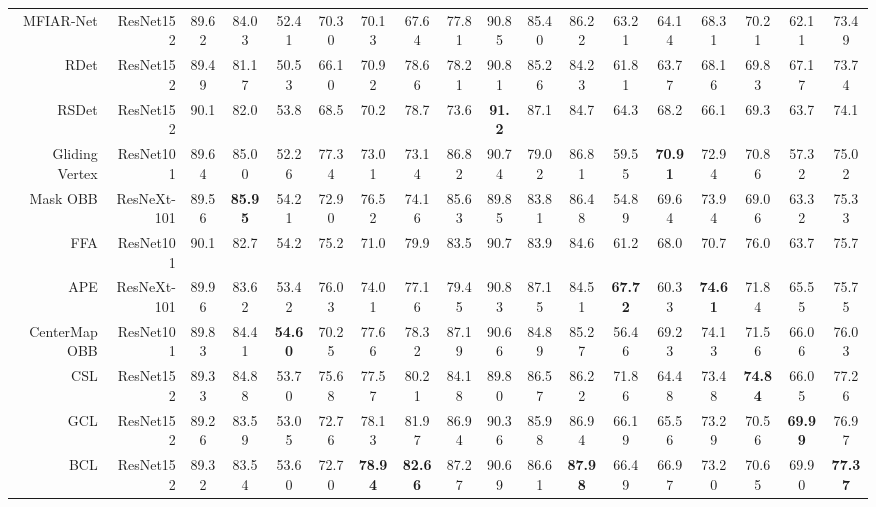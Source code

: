 \documentclass[10pt,journal,compsoc]{IEEEtran}
\begin{document}
\begin{table*}[tb!]
{\begin{tabular}{r|r|c|c|c|c|c|c|c|c|c|c|c|c|c|c|c|c}
			MFIAR-Net \cite{yang2020multi} & ResNet152 & 89.62 & 84.03 & 52.41 & 70.30 & 70.13 & 67.64 & 77.81 & 90.85 & 85.40 & 86.22 & 63.21 & 64.14 & 68.31 & 70.21 & 62.11 & 73.49 \\
			RDet \cite{yang2021r3det} & ResNet152 & 89.49 & 81.17 & 50.53 & 66.10 & 70.92 & 78.66 & 78.21 & 90.81 & 85.26 & 84.23 & 61.81 & 63.77 & 68.16 & 69.83 & 67.17 & 73.74 \\
			RSDet \cite{qian2021learning} & ResNet152 & 90.1 & 82.0 & 53.8 & 68.5 & 70.2 & 78.7 & 73.6 & \textbf{91.2} & 87.1 & 84.7 & 64.3 & 68.2 & 66.1 & 69.3 & 63.7 & 74.1 \\ 
			Gliding Vertex \cite{xu2020gliding} & ResNet101 & 89.64 & 85.00 & 52.26 & 77.34 & 73.01 & 73.14 & 86.82 & 90.74 & 79.02 & 86.81 & 59.55 & \textbf{70.91} & 72.94 & 70.86 & 57.32 & 75.02 \\
			Mask OBB \cite{wang2019mask} & ResNeXt-101 & 89.56 & \textbf{85.95} & 54.21 & 72.90 & 76.52 & 74.16 & 85.63 & 89.85 & 83.81 & 86.48 & 54.89 & 69.64 & 73.94 & 69.06 & 63.32 & 75.33 \\
			FFA \cite{fu2020rotation} & ResNet101 & 90.1 & 82.7 & 54.2 & 75.2 & 71.0 & 79.9 & 83.5 & 90.7 & 83.9 & 84.6 & 61.2 & 68.0 & 70.7 & 76.0 & 63.7 & 75.7 \\
			APE \cite{zhu2020adaptive} & ResNeXt-101 & 89.96 & 83.62 & 53.42 & 76.03 & 74.01 & 77.16 & 79.45 & 90.83 & 87.15 & 84.51 & \textbf{67.72} & 60.33 & \textbf{74.61} & 71.84 & 65.55 & 75.75 \\
			CenterMap OBB \cite{wang2020learning} & ResNet101 & 89.83 & 84.41 & \textbf{54.60} & 70.25 & 77.66 & 78.32 & 87.19 & 90.66 & 84.89 & 85.27 & 56.46 & 69.23 & 74.13 & 71.56 & 66.06 & 76.03\\
			\hline
			CSL & ResNet152 & 89.33 & 84.88 & 53.70 & 75.68 & 77.57 & 80.21 & 84.18 & 89.80 & 86.57 & 86.22 & 71.86 & 64.48 & 73.48 & \textbf{74.84} & 66.05 & 77.26 \\
			GCL & ResNet152 & 89.26 & 83.59 & 53.05 & 72.76 & 78.13 & 81.97 & 86.94 & 90.36 & 85.98 & 86.94 & 66.19 & 65.56 & 73.29 & 70.56 & \textbf{69.99} & 76.97 \\
		    BCL & ResNet152 & 89.32 & 83.54 & 53.60 & 72.70 & \textbf{78.94} & \textbf{82.66} & 87.27 & 90.69 & 86.61 & \textbf{87.98} & 66.49 & 66.97 & 73.20 & 70.65 & 69.90 & \textbf{77.37}\\
			\bottomrule
	\end{tabular}}
	\label{table:DOTA_OBB}
	\vspace{-8pt}
\end{table*}
\end{document}
